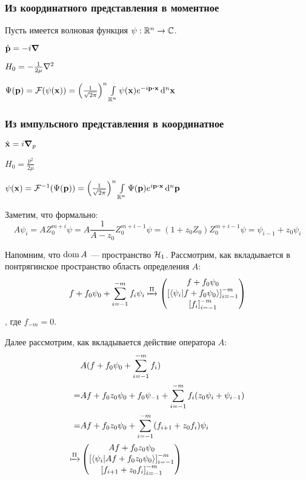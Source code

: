 \subsubsection{Из координатного представления в моментное}
Пусть имеется волновая функция $\psi: \mathbb{R}^n \to \mathbb{C}$. 

$\hat{\vb{p}} = -i \grad$

$H_0 = - \frac{1}{2 \mu} \laplacian$

$\Psi(\vb{p}) = \mcF(\psi(\vb{x})) = \left(\frac{1}{\sqrt{2 \pi}}\right)^n \int\limits_{\bbR^n} \psi(\vb{x}) e^{-i \vb{p} \vdot \vb{x}} \dd[n]{\vb{x}}$

\subsubsection{Из импульсного представления в координатное}

$\hat{\vb{x}} = i \grad_p$

$H_0 = \frac{p^2}{2 \mu}$

$\psi(\vb{x}) = \mcF^{-1}(\Psi(\vb{p})) = \left(\frac{1}{\sqrt{2 \pi}}\right)^n \int\limits_{\bbR^n} \Psi(\vb{p}) e^{i \vb{p} \vdot \vb{x}} \dd[n]{\vb{p}}$


Заметим, что формально:
\[
A \psi_i = A Z_0^{m + i} \psi = A \frac{1}{A - z_0} Z_0^{m + i - 1} \psi = (1 + z_0 Z_0) Z_0^{m + i - 1} \psi = \psi_{i - 1} + z_0 \psi_i
\]

Напомним, что $\operatorname{dom} A$ — пространство $\mathcal{H}_{1}$. Рассмотрим, как вкладывается в понтрягинское пространство область определения $A$:
\[
f + f_0 \psi_0 + \sum\limits_{i = -1}^{-m} f_i \psi_i \xmapsto[]{\Pi}
\begin{pmatrix}
f + f_0 \psi_0 \\
\left[ \ip{\psi_i}{f + f_0 \psi_0} \right]_{i = -1}^{-m} \\
\left[ f_i \right]_{i = -1}^{-m}
\end{pmatrix}
\]
, где $f_{-m} = 0$.

Далее рассмотрим, как вкладывается действие оператора $A$:
\begin{align*}
  & A(f + f_0 \psi_0 + \sum\limits_{i = -1}^{-m} f_i) \\
= & A f + f_0 z_0 \psi_0 + f_0 \psi_{-1} + \sum\limits_{i = -1}^{-m} f_i (z_0 \psi_i + \psi_{i - 1}) \\
= & A f + f_0 z_0 \psi_0 + \sum\limits_{i = -1}^{-m} (f_{i + 1} + z_0 f_i) \psi_i  \\
\xmapsto[]{\Pi} &
\begin{pmatrix}
A f + f_0 z_0 \psi_0 \\
\left[ \ip{\psi_i}{A f + f_0 z_0 \psi_0} \right]_{i = -1}^{-m} \\
\left[ f_{i + 1} + z_0 f_i\right]_{i = -1}^{-m}
\end{pmatrix}
\end{align*}

